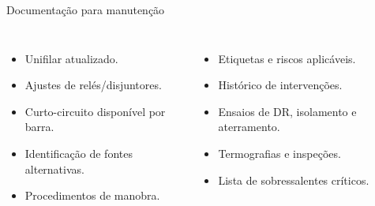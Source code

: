 \begin{frame}{Documentação para manutenção}
\small
\begin{columns}[T,onlytextwidth]
\begin{itemize}
\item Unifilar atualizado.
\item Ajustes de relés/disjuntores.
\item Curto-circuito disponível por barra.
\item Identificação de fontes alternativas.
\item Procedimentos de manobra.
\end{itemize}
\begin{itemize}
\item Etiquetas e riscos aplicáveis.
\item Histórico de intervenções.
\item Ensaios de DR, isolamento e aterramento.
\item Termografias e inspeções.
\item Lista de sobressalentes críticos.
\end{itemize}
\end{columns}
\end{frame}

